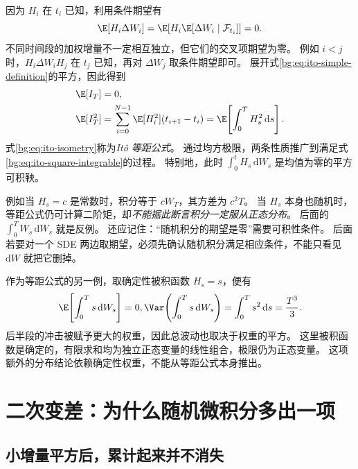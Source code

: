 因为 $H_i$ 在 $t_i$ 已知，利用条件期望有
\begin{equation}
  \E[H_i\Delta W_i]
  =\E\!\left[H_i\E[\Delta W_i\mid\mathcal F_{t_i}]\right]=0.
  \label{bg:eq:zero-mean-step}
\end{equation}
不同时间段的加权增量不一定相互独立，但它们的交叉项期望为零。
例如 $i<j$ 时，$H_i\Delta W_i H_j$ 在 $t_j$ 已知，再对 $\Delta W_j$ 取条件期望即可。
展开式\eqref{bg:eq:ito-simple-definition}的平方，因此得到
\begin{align}
  \E[I_T]&=0,\label{bg:eq:ito-mean}\\
  \E[I_T^2]
  &=\sum_{i=0}^{N-1}\E[H_i^2](t_{i+1}-t_i)
   =\E\!\left[\int_0^T H_s^2\,\mathrm ds\right].
  \label{bg:eq:ito-isometry}
\end{align}
式\eqref{bg:eq:ito-isometry}称为\emph{It\^o 等距公式}。
通过均方极限，两条性质推广到满足式\eqref{bg:eq:ito-square-integrable}的过程。
特别地，此时 $\int_0^t H_s\,\mathrm dW_s$ 是均值为零的平方可积鞅。

例如当 $H_s=c$ 是常数时，积分等于 $cW_T$，其方差为 $c^2T$。
当 $H_s$ 本身也随机时，等距公式仍可计算二阶矩，却\emph{不能据此断言积分一定服从正态分布}。
后面的 $\int_0^T W_s\,\mathrm dW_s$ 就是反例。
还应记住：“随机积分的期望是零”需要可积性条件。
后面若要对一个 SDE 两边取期望，必须先确认随机积分满足相应条件，不能只看见 $\mathrm dW$ 就把它删掉。

作为等距公式的另一例，取确定性被积函数 $H_s=s$，便有
\begin{equation}
  \E\!\left[\int_0^T s\,\mathrm dW_s\right]=0,
  \Var\!\left(\int_0^T s\,\mathrm dW_s\right)
  =\int_0^T s^2\,\mathrm ds=\frac{T^3}{3}.
  \label{bg:eq:deterministic-integrand}
\end{equation}
后半段的冲击被赋予更大的权重，因此总波动也取决于权重的平方。
这里被积函数是确定的，有限求和均为独立正态变量的线性组合，极限仍为正态变量。
这项额外的分布结论依赖确定性权重，不能从等距公式本身推出。

\section{二次变差：为什么随机微积分多出一项}
\label{bg:sec:quadratic-variation}

\subsection{小增量平方后，累计起来并不消失}
\label{bg:sub:qv-calculation}

